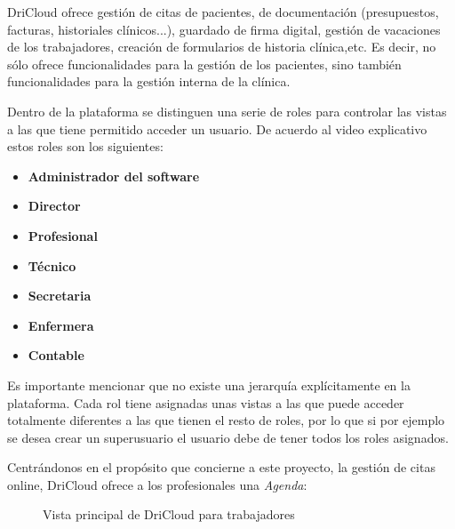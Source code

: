 DriCloud ofrece gestión de citas de pacientes, de documentación (presupuestos, facturas, historiales clínicos...), guardado de firma digital, gestión de vacaciones de los trabajadores, creación de formularios de historia clínica,etc. Es decir, no sólo ofrece funcionalidades para la gestión de los pacientes, sino también funcionalidades para la gestión interna de la clínica. \bigskip

Dentro de la plataforma se distinguen una serie de roles para controlar las vistas a las que tiene permitido acceder un usuario. De acuerdo al video explicativo estos roles son los siguientes:

\begin{itemize}
    \item \textbf{Administrador del software}
    \item \textbf{Director}
    \item \textbf{Profesional}
    \item \textbf{Técnico} 
    \item \textbf{Secretaria}
    \item \textbf{Enfermera}
    \item \textbf{Contable}
\end{itemize}

Es importante mencionar que no existe una jerarquía explícitamente en la plataforma. Cada rol tiene asignadas unas vistas a las que puede acceder totalmente diferentes a las que tienen el resto de roles, por lo que si por ejemplo se desea crear un superusuario el usuario debe de tener todos los roles asignados. \bigskip

Centrándonos en el propósito que concierne a este proyecto, la gestión de citas online, DriCloud ofrece a los profesionales una \textit{Agenda}: 

\begin{figure}[H]
    \caption{Vista principal de DriCloud para trabajadores}
    \label{fig:dricloud-principal}
\end{figure}

